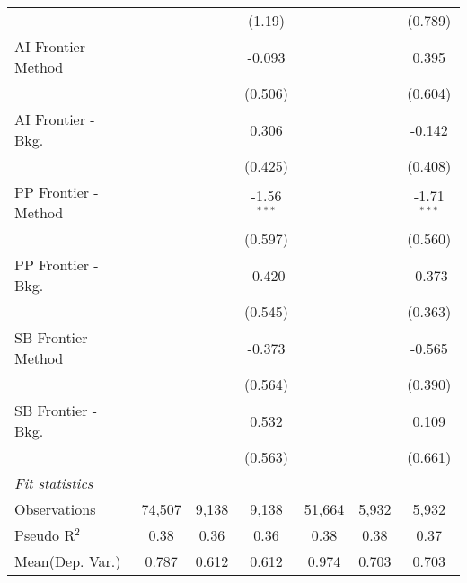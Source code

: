 \begin{tabular}{lcccccc}
                               &         &               & (1.19)        &         &               & (0.789)\\   
   AI Frontier - Method        &         &               & -0.093        &         &               & 0.395\\   
                               &         &               & (0.506)       &         &               & (0.604)\\   
   AI Frontier - Bkg.          &         &               & 0.306         &         &               & -0.142\\   
                               &         &               & (0.425)       &         &               & (0.408)\\   
   PP Frontier - Method        &         &               & -1.56$^{***}$ &         &               & -1.71$^{***}$\\   
                               &         &               & (0.597)       &         &               & (0.560)\\   
   PP Frontier - Bkg.          &         &               & -0.420        &         &               & -0.373\\   
                               &         &               & (0.545)       &         &               & (0.363)\\   
   SB Frontier - Method        &         &               & -0.373        &         &               & -0.565\\   
                               &         &               & (0.564)       &         &               & (0.390)\\   
   SB Frontier - Bkg.          &         &               & 0.532         &         &               & 0.109\\   
                               &         &               & (0.563)       &         &               & (0.661)\\   
   \midrule
   \emph{Fit statistics}\\
   Observations                & 74,507  & 9,138         & 9,138         & 51,664  & 5,932         & 5,932\\  
   Pseudo R$^2$                & 0.38    & 0.36          & 0.36          & 0.38    & 0.38          & 0.37\\  
Mean(Dep. Var.) & 0.787 & 0.612 & 0.612 & 0.974 & 0.703 & 0.703 \\
   

\end{tabular}
